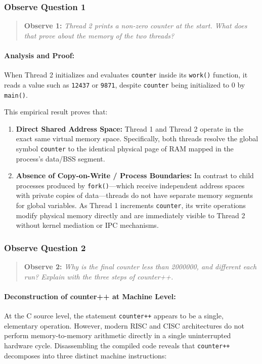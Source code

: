\documentclass{labreport}
\begin{document}
\subsubsection{Observe Question 1}
\begin{quote}
\textbf{Observe 1:} \textit{Thread 2 prints a non-zero counter at the start. What does that prove about the memory of the two threads?}
\end{quote}

\paragraph{Analysis and Proof:}
When Thread 2 initializes and evaluates \texttt{counter} inside its \texttt{work()} function, it reads a value such as \texttt{12437} or \texttt{9871}, despite \texttt{counter} being initialized to $0$ by \texttt{main()}.

This empirical result proves that:
\begin{enumerate}[noitemsep]
    \item \textbf{Direct Shared Address Space:} Thread 1 and Thread 2 operate in the exact same virtual memory space. Specifically, both threads resolve the global symbol \texttt{counter} to the identical physical page of RAM mapped in the process's data/BSS segment.
    \item \textbf{Absence of Copy-on-Write / Process Boundaries:} In contrast to child processes produced by \texttt{fork()}—which receive independent address spaces with private copies of data—threads do not have separate memory segments for global variables. As Thread 1 increments \texttt{counter}, its write operations modify physical memory directly and are immediately visible to Thread 2 without kernel mediation or IPC mechanisms.
\end{enumerate}

\subsubsection{Observe Question 2}
\begin{quote}
\textbf{Observe 2:} \textit{Why is the final counter less than 2000000, and different each run? Explain with the three steps of counter++.}
\end{quote}

\paragraph{Deconstruction of counter++ at Machine Level:}
At the C source level, the statement \texttt{counter++} appears to be a single, elementary operation. However, modern RISC and CISC architectures do not perform memory-to-memory arithmetic directly in a single uninterrupted hardware cycle. Disassembling the compiled code reveals that \texttt{counter++} decomposes into three distinct machine instructions:
\end{document}
